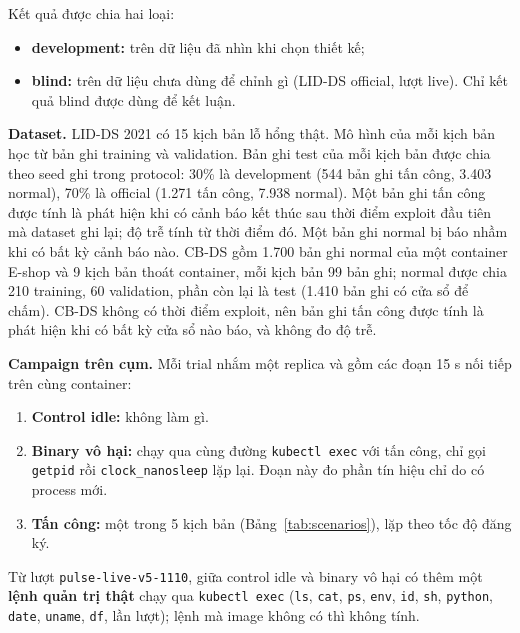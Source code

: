 Kết quả được chia hai loại:

\begin{itemize}
\tightlist
\item
  \textbf{development:} trên dữ liệu đã nhìn khi chọn thiết kế;
\item
  \textbf{blind:} trên dữ liệu chưa dùng để chỉnh gì (LID-DS official, lượt live). Chỉ kết quả blind được dùng để kết luận.
\end{itemize}

\textbf{Dataset.} LID-DS 2021 \citep{grimmer2022} có 15 kịch bản lỗ hổng thật. Mô hình của mỗi kịch bản học từ bản ghi training và validation. Bản ghi test của mỗi kịch bản được chia theo seed ghi trong protocol: 30\% là development (544 bản ghi tấn công, 3.403 normal), 70\% là official (1.271 tấn công, 7.938 normal). Một bản ghi tấn công được tính là phát hiện khi có cảnh báo kết thúc sau thời điểm exploit đầu tiên mà dataset ghi lại; độ trễ tính từ thời điểm đó. Một bản ghi normal bị báo nhầm khi có bất kỳ cảnh báo nào. CB-DS \citep{elkhairi2022} gồm 1.700 bản ghi normal của một container E-shop và 9 kịch bản thoát container, mỗi kịch bản 99 bản ghi; normal được chia 210 training, 60 validation, phần còn lại là test (1.410 bản ghi có cửa sổ để chấm). CB-DS không có thời điểm exploit, nên bản ghi tấn công được tính là phát hiện khi có bất kỳ cửa sổ nào báo, và không đo độ trễ.

\textbf{Campaign trên cụm.} Mỗi trial nhắm một replica và gồm các đoạn 15 s nối tiếp trên cùng container:

\begin{enumerate}
\def\labelenumi{\arabic{enumi}.}
\tightlist
\item
  \textbf{Control idle:} không làm gì.
\item
  \textbf{Binary vô hại:} chạy qua cùng đường \texttt{kubectl\ exec} với tấn công, chỉ gọi \texttt{getpid} rồi \texttt{clock\_\allowbreak{}nanosleep} lặp lại. Đoạn này đo phần tín hiệu chỉ do có process mới.
\item
  \textbf{Tấn công:} một trong 5 kịch bản (Bảng~\ref{tab:scenarios}), lặp theo tốc độ đăng ký.
\end{enumerate}

Từ lượt \texttt{pulse-\allowbreak{}live-\allowbreak{}v5-\allowbreak{}1110}, giữa control idle và binary vô hại có thêm một \textbf{lệnh quản trị thật} chạy qua \texttt{kubectl\ exec} (\texttt{ls}, \texttt{cat}, \texttt{ps}, \texttt{env}, \texttt{id}, \texttt{sh}, \texttt{python}, \texttt{date}, \texttt{uname}, \texttt{df}, lần lượt); lệnh mà image không có thì không tính.

